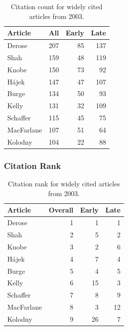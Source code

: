 \documentclass[
  10pt,
  letterpaper,
  DIV=11,
  numbers=noendperiod,
  twoside]{scrartcl}
\begin{document}
\begin{longtable}[]{@{}lrrr@{}}

\caption{\label{tbl-citation-count-2003}Citation count for widely cited
articles from 2003.}

\tabularnewline

\toprule\noalign{}
Article & All & Early & Late \\
\midrule\noalign{}
\endhead
\bottomrule\noalign{}
\endlastfoot
Derose & 207 & 85 & 137 \\
Shah & 159 & 48 & 119 \\
Knobe & 150 & 73 & 92 \\
Hájek & 147 & 47 & 107 \\
Burge & 134 & 50 & 93 \\
Kelly & 131 & 32 & 109 \\
Schaffer & 115 & 45 & 75 \\
MacFarlane & 107 & 51 & 64 \\
Kolodny & 104 & 22 & 88 \\

\end{longtable}

\subsubsection*{Citation Rank}\label{citation-rank-27}

\begin{longtable}[]{@{}lrrr@{}}

\caption{\label{tbl-citation-rank-2003}Citation rank for widely cited
articles from 2003.}

\tabularnewline

\toprule\noalign{}
Article & Overall & Early & Late \\
\midrule\noalign{}
\endhead
\bottomrule\noalign{}
\endlastfoot
Derose & 1 & 1 & 1 \\
Shah & 2 & 5 & 2 \\
Knobe & 3 & 2 & 6 \\
Hájek & 4 & 7 & 4 \\
Burge & 5 & 4 & 5 \\
Kelly & 6 & 15 & 3 \\
Schaffer & 7 & 8 & 9 \\
MacFarlane & 8 & 3 & 12 \\
Kolodny & 9 & 26 & 7 \\

\end{longtable}
\end{document}
